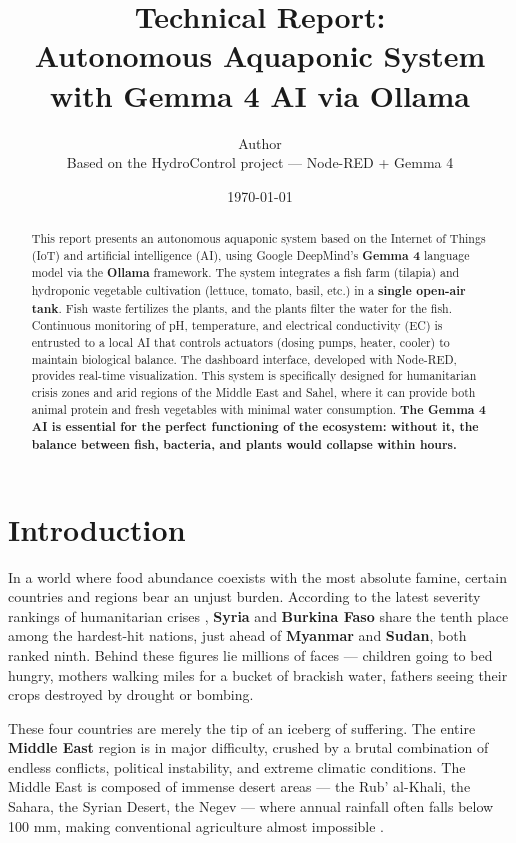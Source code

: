 \documentclass[12pt,a4paper]{article}
\title{\textbf{Technical Report:\\Autonomous Aquaponic System with Gemma 4 AI via Ollama}}
\author{Author\\ \small{Based on the HydroControl project — Node-RED + Gemma 4}}
\date{\today}
\begin{document}
\maketitle

\begin{abstract}
This report presents an autonomous aquaponic system based on the Internet of Things (IoT) and artificial intelligence (AI), using Google DeepMind's \textbf{Gemma 4} language model via the \textbf{Ollama} framework. The system integrates a fish farm (tilapia) and hydroponic vegetable cultivation (lettuce, tomato, basil, etc.) in a \textbf{single open-air tank}. Fish waste fertilizes the plants, and the plants filter the water for the fish. Continuous monitoring of pH, temperature, and electrical conductivity (EC) is entrusted to a local AI that controls actuators (dosing pumps, heater, cooler) to maintain biological balance. The dashboard interface, developed with Node-RED, provides real-time visualization. This system is specifically designed for humanitarian crisis zones and arid regions of the Middle East and Sahel, where it can provide both animal protein and fresh vegetables with minimal water consumption. \textbf{The Gemma 4 AI is essential for the perfect functioning of the ecosystem: without it, the balance between fish, bacteria, and plants would collapse within hours.}
\end{abstract}

\section{Introduction}

In a world where food abundance coexists with the most absolute famine, certain countries and regions bear an unjust burden. According to the latest severity rankings of humanitarian crises \cite{aquaponics2022}, \textbf{Syria} and \textbf{Burkina Faso} share the tenth place among the hardest-hit nations, just ahead of \textbf{Myanmar} and \textbf{Sudan}, both ranked ninth. Behind these figures lie millions of faces — children going to bed hungry, mothers walking miles for a bucket of brackish water, fathers seeing their crops destroyed by drought or bombing.

These four countries are merely the tip of an iceberg of suffering. The entire \textbf{Middle East} region is in major difficulty, crushed by a brutal combination of endless conflicts, political instability, and extreme climatic conditions. The Middle East is composed of immense desert areas — the Rub' al-Khali, the Sahara, the Syrian Desert, the Negev — where annual rainfall often falls below 100 mm, making conventional agriculture almost impossible \cite{watan2025}.
\end{document}
